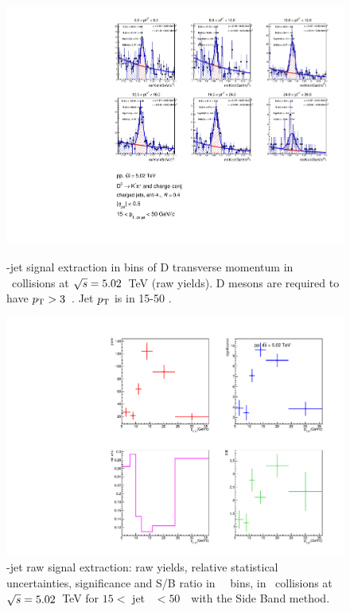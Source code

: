 \begin{figure}[bth]
\centering
\begin{minipage}{.65\textwidth}
  \centering
  \includegraphics[width=\linewidth]{pp_2sig/R4_jetbin_15_50/invMass_pTD5}
\caption{\Dzero-jet signal extraction in bins of D transverse momentum in \pp\ collisions at $\sqrt{s}=5.02$~TeV (raw yields). D mesons are required to have $p_{\rm T}>3$~\GeVc. Jet $p_{\rm T}$ is in 15-50 \GeVc.
}
\label{fig:eq_pp_InvMass_Dzero_15_50_R4}
\end{minipage}%
\begin{minipage}{.4\textwidth}
  \centering
  \includegraphics[width=\linewidth]{pp_2sig/R4_jetbin_15_50/signalParams_pTD5}
\caption{%
\Dzero-jet raw signal extraction: raw yields, relative statistical uncertainties, significance and S/B ratio in \Dzero\ \pt\ bins, in \pp\ collisions at $\sqrt{s}=5.02$~TeV for $15<$ jet \pt\ $<50$~\GeVc\ with the Side Band method.
}
\label{fig:eq_pp_signalParams_15_50_R4}
\end{minipage}
\end{figure}
